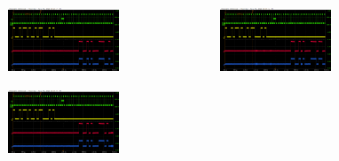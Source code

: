 \documentclass[aspectratio=169]{beamer}
\begin{document}
\begin{frame}[noframenumbering]
\begin{columns}
\begin{center}
\begin{figure}
				\caption{}
			\end{figure}		
		\end{center}
		\begin{center}
			\begin{figure}
				\includegraphics[width=0.95 \textwidth]{IMG/probe/09-08-2021_ch05-read57-baselinedac1.png}
				\caption{}
			\end{figure}
			\begin{figure}
				\includegraphics[width=0.95 \textwidth]{IMG/probe/09-08-2021_ch05-read58-baselinedac1.png}
				\caption{}
			\end{figure}	
		\end{center}
		\begin{center}
			\begin{figure}
				\includegraphics[width=0.95 \textwidth]{IMG/probe/09-08-2021_ch05-read59-baselinedac1.png}

\end{figure}
\end{center}
\end{columns}
\end{frame}
\end{document}

